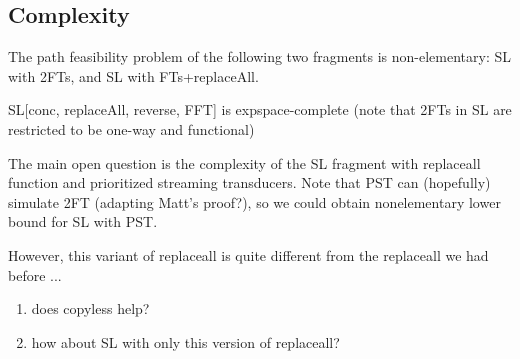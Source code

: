 \subsection{Complexity}

\begin{proposition}[POPL'19]
	The path feasibility problem of the following two fragments is non-elementary: SL with 2FTs, and SL with FTs+replaceAll.
	
	SL[conc, replaceAll, reverse, FFT] is expspace-complete (note that 2FTs in SL are restricted to be one-way and functional)
\end{proposition}



The main open question is the complexity of the SL fragment with replaceall function and prioritized streaming transducers. Note that PST can (hopefully) simulate 2FT (adapting Matt's proof?), so we could obtain nonelementary lower bound for SL with PST.

However, this variant of replaceall is quite different from the replaceall we had before ...

\begin{enumerate}
\item  does  copyless help?
\item how about SL with only this version of replaceall?
\end{enumerate}
